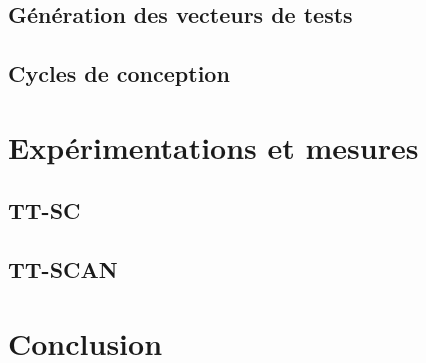 \subsection{Génération des vecteurs de tests}
\subsection{Cycles de conception}

\section{Expérimentations et mesures}

\subsection{TT-SC}
\subsection{TT-SCAN}


\section*{Conclusion}


